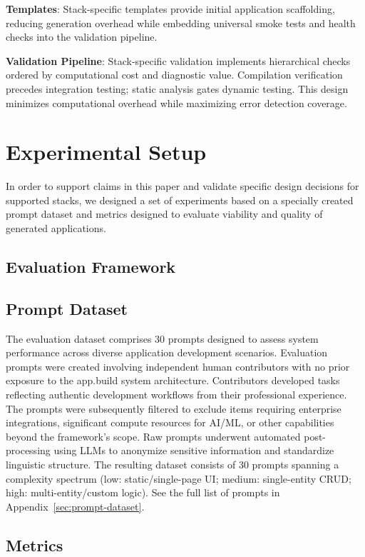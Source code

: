 \documentclass{article}
\begin{document}
\textbf{Templates}: Stack-specific templates provide initial application scaffolding, reducing generation overhead while embedding universal smoke tests and health checks into the validation pipeline.

\textbf{Validation Pipeline}: Stack-specific validation implements hierarchical checks ordered by computational cost and diagnostic value. Compilation verification precedes integration testing; static analysis gates dynamic testing. This design minimizes computational overhead while maximizing error detection coverage.

\section{Experimental Setup}

In order to support claims in this paper and validate specific design decisions for supported stacks, we designed a set of experiments based on a specially created prompt dataset and metrics designed to evaluate viability and quality of generated applications.

\subsection{Evaluation Framework}

\subsection{Prompt Dataset}
\label{sec:prompt-dataset-desc}

The evaluation dataset comprises 30 prompts designed to assess system performance across diverse application development scenarios. Evaluation prompts were created involving independent human contributors with no prior exposure to the app.build system architecture. Contributors developed tasks reflecting authentic development workflows from their professional experience. The prompts were subsequently filtered to exclude items requiring enterprise integrations, significant compute resources for AI/ML, or other capabilities beyond the framework's scope. Raw prompts underwent automated post-processing using LLMs to anonymize sensitive information and standardize linguistic structure.
The resulting dataset consists of 30 prompts spanning a complexity spectrum (low: static/single-page UI; medium: single-entity CRUD; high: multi-entity/custom logic).
See the full list of prompts in Appendix~\ref{sec:prompt-dataset}.

\subsection{Metrics}
\end{document}
